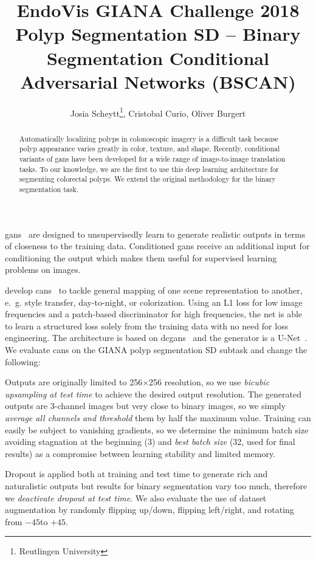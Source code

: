\documentclass[12pt]{article}
\title{EndoVis GIANA Challenge 2018 Polyp Segmentation SD -- Binary Segmentation Conditional Adversarial Networks (BSCAN)}
\author{Josia Scheytt\thanks{Reutlingen University}, Cristobal Curio\footnotemark[1], Oliver Burgert\footnotemark[1]}
\begin{document}
\maketitle

\begin{abstract}
Automatically localizing polyps in colonoscopic imagery is a difficult task because polyp appearance varies greatly in color, texture, and shape.
Recently, conditional variants of \glspl{gan} have been developed for a wide range of image-to-image translation tasks.
To our knowledge, we are the first to use this deep learning architecture for segmenting colorectal polyps.
We extend the original methodology for the binary segmentation task.
\end{abstract}

\glspl{gan}~\cite{Goodfellow.2014} are designed to unsupervisedly learn to generate realistic outputs in terms of closeness to the training data.
Conditioned \glspl{gan} receive an additional input for conditioning the output which makes them useful for supervised learning problems on images.

\citeauthor{Isola.2017} develop \glspl{can}~\cite{Isola.2017} to tackle general mapping of one scene representation to another, e.~g. style transfer, day-to-night, or colorization.
Using an L1 loss for low image frequencies and a patch-based discriminator for high frequencies, the net is able to learn a structured loss solely from the training data with no need for loss engineering.
The architecture is based on \glspl{dcgan}~\cite{Radford.2016} and the generator is a U-Net~\cite{Ronneberger.2015}.
We evaluate \glspl{can} on the GIANA polyp segmentation SD subtask and change the following:

Outputs are originally limited to 256$\times$256 resolution, so we use \emph{bicubic upsampling at test time} to achieve the desired output resolution.
The generated outputs are 3-channel images but very close to binary images, so we simply \emph{average all channels and threshold} them by half the maximum value.
Training can easily be subject to vanishing gradients, so we determine the minimum batch size avoiding stagnation at the beginning (3) and \emph{best batch size} (32, used for final results) as a compromise between learning stability and limited memory.

Dropout is applied both at training and test time to generate rich and naturalistic outputs but results for binary segmentation vary too much, therefore we \emph{deactivate dropout at test time}.
We also evaluate the use of dataset augmentation by randomly flipping up/down, flipping left/right, and rotating from $-45$\textdegree to $+45$\textdegree.

\printbibliography
\end{document}
